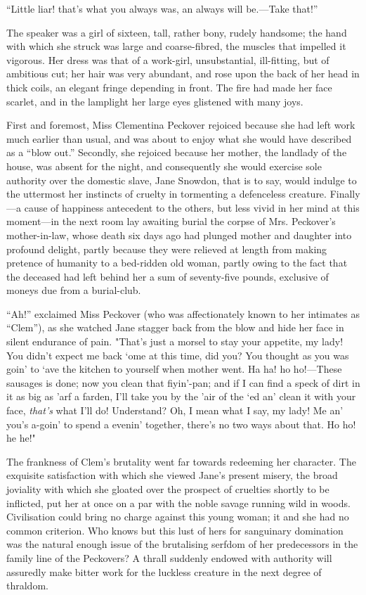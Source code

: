 ``Little liar! that's what you always was, an always will be.---Take
that!''

{\protect\hypertarget{11}{}{}}The speaker was a girl of sixteen, tall,
rather bony, rudely handsome; the hand with which she struck was large
and coarse-fibred, the muscles that impelled it vigorous. Her dress was
that of a work-girl, unsubstantial, ill-fitting, but of ambitious cut;
her hair was very abundant, and rose upon the back of her head in thick
coils, an elegant fringe depending in front. The fire had made her face
scarlet, and in the lamplight her large eyes glistened with many joys.

First and foremost, Miss Clementina Peckover rejoiced because she had
left work much earlier than usual, and was about to enjoy what she would
have described as a ``blow out.'' Secondly, she rejoiced because her
mother, the landlady of the house, was absent for the night, and
consequently she would exercise sole authority over the domestic slave,
Jane Snowdon, that is to say, would indulge to the uttermost her
instincts of cruelty in tormenting a defenceless creature. Finally---a
cause of happiness antecedent to {\protect\hypertarget{12}{}{}}the
others, but less vivid in her mind at this moment---in the next room lay
awaiting burial the corpse of Mrs. Peckover's mother-in-law, whose death
six days ago had plunged mother and daughter into profound delight,
partly because they were relieved at length from making pretence of
humanity to a bed-ridden old woman, partly owing to the fact that the
deceased had left behind her a sum of seventy-five pounds, exclusive of
moneys due from a burial-club.

``Ah!'' exclaimed Miss Peckover (who was affectionately known to her
intimates as ``Clem''), as she watched Jane stagger back from the blow
and hide her face in silent endurance of pain. "That's just a morsel to
stay your appetite, my lady! You didn't expect me back `ome at this
time, did you? You thought as you was goin' to `ave the kitchen to
yourself when mother went. Ha ha! ho ho!---These sausages is done; now
you clean that fiyin'-pan; and if I can find a speck of dirt in it as
big as 'arf a farden, I'll take you by the 'air of
{\protect\hypertarget{13}{}{}}the `ed an' clean it with your face,
\emph{that's} what I'll do! Understand? Oh, I mean what I say, my lady!
Me an' you's a-goin' to spend a evenin' together, there's no two ways
about that. Ho ho! he he!"

The frankness of Clem's brutality went far towards redeeming her
character. The exquisite satisfaction with which she viewed Jane's
present misery, the broad joviality with which she gloated over the
prospect of cruelties shortly to be inflicted, put her at once on a par
with the noble savage running wild in woods. Civilisation could bring no
charge against this young woman; it and she had no common criterion. Who
knows but this lust of hers for sanguinary domination was the natural
enough issue of the brutalising serfdom of her predecessors in the
family line of the Peckovers? A thrall suddenly endowed with authority
will assuredly make bitter work for the luckless creature in the next
degree of thraldom.

